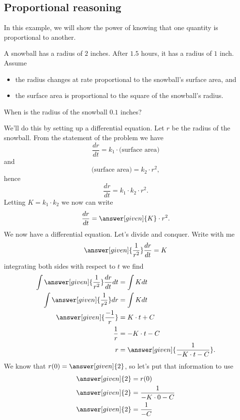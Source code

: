 \documentclass{ximera}
\begin{document}
\subsection{Proportional reasoning}

In this example, we will show the power of knowing that one quantity
is proportional to another.

\begin{example}
  A snowball has a radius of $2$ inches. After $1.5$ hours, it has a
  radius of $1$ inch. Assume
  \begin{itemize}
  \item the radius changes at rate proportional to the snowball's
    surface area, and
  \item the surface area is proportional to the square of the
    snowball's radius.
  \end{itemize}
  When is the radius of the snowball $0.1$ inches?
  \begin{explanation}
    We'll do this by setting up a differential equation. Let $r$ be
    the radius of the snowball. From the statement of the problem we
    have
    \[
    \frac{dr}{dt} = k_1 \cdot \text{(surface area)}
    \]
    and
    \[
    \text{(surface area)} = k_2 \cdot r^2,
    \]
    hence
    \[
    \frac{dr}{dt} = k_1 \cdot k_2 \cdot r^2.
    \]
    Letting $K = k_1\cdot k_2$ we now can write
    \[
    \frac{dr}{dt} = \answer[given]{K}\cdot r^2.
    \]
    We now have a differential equation. Let's divide and
    conquer. Write with me
    \[
    \answer[given]{\frac{1}{r^2}}\frac{dr}{dt} = K
    \]
    integrating both sides with respect to $t$ we find
    \begin{align*}
      \int \answer[given]{\frac{1}{r^2}}\frac{dr}{dt} dt &= \int K dt\\
      \int \answer[given]{\frac{1}{r^2}} dr &= \int K dt\\
      \answer[given]{\frac{-1}{r}} &= K\cdot t+C\\
      \frac{1}{r} &= -K\cdot t- C\\
      r &=\answer[given]{\frac{1}{-K\cdot t- C}}.
    \end{align*}
    We know that $r(0) = \answer[given]{2}$, so let's put that information to use
    \begin{align*}
      \answer[given]{2} &= r(0)\\
      \answer[given]{2} &= \frac{1}{-K\cdot 0- C}\\
      \answer[given]{2} &= \frac{1}{- C}\\

\end{align*}
\end{explanation}
\end{example}
\end{document}
